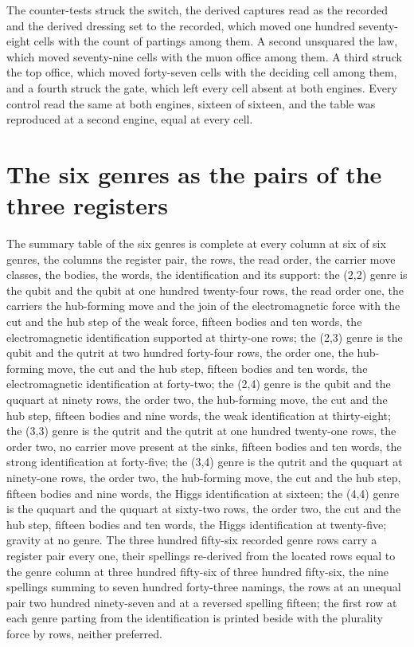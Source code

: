 \begin{chproof}[instrument]
The counter-tests struck the switch, the derived captures read as the recorded and the derived dressing set to the recorded, which moved one hundred seventy-eight cells with the count of partings among them. A second unsquared the law, which moved seventy-nine cells with the muon office among them. A third struck the top office, which moved forty-seven cells with the deciding cell among them, and a fourth struck the gate, which left every cell absent at both engines. Every control read the same at both engines, sixteen of sixteen, and the table was reproduced at a second engine, equal at every cell.
\end{chproof}

\section{The six genres as the pairs of the three registers}\label{mod:IV-8d-D539836-the-six-genres-as-the-pairs-of-the-three-registers}
\begin{chtable}
The summary table of the six genres is complete at every column at six of six genres, the columns the register pair, the rows, the read order, the carrier move classes, the bodies, the words, the identification and its support: the (2,2) genre is the qubit and the qubit at one hundred twenty-four rows, the read order one, the carriers the hub-forming move and the join of the electromagnetic force with the cut and the hub step of the weak force, fifteen bodies and ten words, the electromagnetic identification supported at thirty-one rows; the (2,3) genre is the qubit and the qutrit at two hundred forty-four rows, the order one, the hub-forming move, the cut and the hub step, fifteen bodies and ten words, the electromagnetic identification at forty-two; the (2,4) genre is the qubit and the ququart at ninety rows, the order two, the hub-forming move, the cut and the hub step, fifteen bodies and nine words, the weak identification at thirty-eight; the (3,3) genre is the qutrit and the qutrit at one hundred twenty-one rows, the order two, no carrier move present at the sinks, fifteen bodies and ten words, the strong identification at forty-five; the (3,4) genre is the qutrit and the ququart at ninety-one rows, the order two, the hub-forming move, the cut and the hub step, fifteen bodies and nine words, the Higgs identification at sixteen; the (4,4) genre is the ququart and the ququart at sixty-two rows, the order two, the cut and the hub step, fifteen bodies and ten words, the Higgs identification at twenty-five; gravity at no genre. The three hundred fifty-six recorded genre rows carry a register pair every one, their spellings re-derived from the located rows equal to the genre column at three hundred fifty-six of three hundred fifty-six, the nine spellings summing to seven hundred forty-three namings, the rows at an unequal pair two hundred ninety-seven and at a reversed spelling fifteen; the first row at each genre parting from the identification is printed beside with the plurality force by rows, neither preferred.
\end{chtable}
